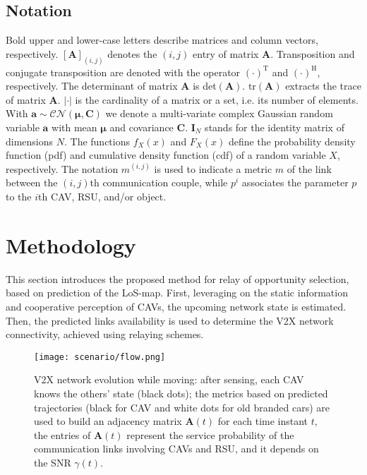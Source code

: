 \documentclass[journal]{IEEEtran}
\DeclarePairedDelimiter\floor{\lfloor}{\rfloor}
\begin{document}
\subsection*{Notation}
Bold upper and lower-case letters describe matrices and column vectors, respectively. $\left[\mathbf{{A}}\right]_{(i,j)}$ denotes the $(i,j)$ entry of matrix $\mathbf{A}$. Transposition and conjugate transposition are denoted with the operator $(\cdot)^{\mathrm{T}}$ and $(\cdot)^{\mathrm{H}}$, respectively. The determinant of matrix $\mathbf{A}$ is det$(\mathbf{A})$. $\mathrm{tr}\left(\mathbf{A}\right)$ extracts the trace of matrix $\mathbf{A}$. $|\cdot|$ is the cardinality of a matrix or a set, i.e. its number of elements.
With $\mathbf{a}\sim\mathcal{CN}(\boldsymbol{\mu},\mathbf{C})$ we denote a multi-variate complex Gaussian random variable $\mathbf{a}$ with mean $\boldsymbol{\mu}$ and covariance $\mathbf{C}$. $\mathbf{I}_N$ stands for the identity matrix of dimensions $N$. 
The functions $f_X(x)$ and $F_X(x)$ define the probability density function (pdf) and cumulative density function (cdf) of a random variable $X$, respectively.
The notation ${m}^{(i,j)}$ is used to indicate a metric $m$ of the link between the $(i,j)$th communication couple, while ${p}^{i}$  associates the parameter $p$ to the $i$th CAV, RSU, and/or object. 

\section{Methodology}

This section introduces the proposed method for relay of opportunity selection, based on prediction of the LoS-map. First, leveraging on the static information and cooperative perception of CAVs, the upcoming network state is estimated. Then, the predicted links availability is used to determine the V2X network connectivity, achieved using relaying schemes.


\begin{figure*}[t!] 
\centering
  \texttt{[image: scenario/flow.png]}
  \caption{V2X network evolution while moving: after sensing, each CAV knows the others' state (black dots); the metrics based on predicted trajectories (black for CAV and white dots for old branded cars) are used to build an adjacency matrix $\mathbf{A}(t)$ for each time instant $t$, the entries of $\mathbf{A}(t)$ represent the service probability of the communication links involving CAVs and RSU, and it depends on the SNR ${\gamma}(t)$.}
  \label{fig:graph}
\end{figure*}
\end{document}

